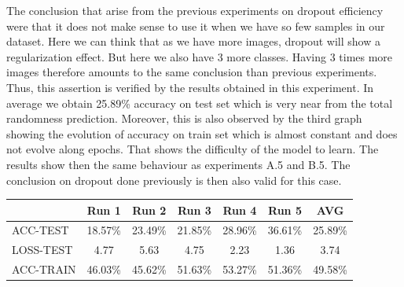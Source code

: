 \documentclass[11pt, openany]{report}
\theoremstyle{plain}
\theoremstyle{definition}
\theoremstyle{remark}
\begin{document}
The conclusion that arise from the previous experiments on dropout efficiency were that it does not make sense to use it when we have so few samples in our dataset. Here we can think that as we have more images, dropout will show a regularization effect. But here we also have 3 more classes. Having 3 times more images therefore amounts to the same conclusion than previous experiments. Thus, this assertion is verified by the results obtained in this experiment. In average we obtain 25.89\% accuracy on test set which is very near from the total randomness prediction. Moreover, this is also observed by the third graph showing the evolution of accuracy on train set which is almost constant and does not evolve along epochs. That shows the difficulty of the model to learn. The results show then the same behaviour as experiments A.5 and B.5. The conclusion on dropout done previously is then also valid for this case.    

\begin{center}
\begin{tabular}{|l|c|c|c|c|c|c|}
  \hline
   & \textbf{Run 1} & \textbf{Run 2} & \textbf{Run 3} & \textbf{Run 4} & \textbf{Run 5} & \textbf{AVG}\\
  \hline
  ACC-TEST & 18.57\% & 23.49\% & 21.85\% & 28.96\% & 36.61\% & 25.89\% \\
  LOSS-TEST & 4.77 & 5.63 & 4.75 & 2.23  & 1.36 & 3.74 \\ 
  ACC-TRAIN & 46.03\% & 45.62\% & 51.63\% & 53.27\% & 51.36\% & 49.58\% \\ 
  \hline
\end{tabular}
\label{table:results-C5}
\end{center}
\end{document}
